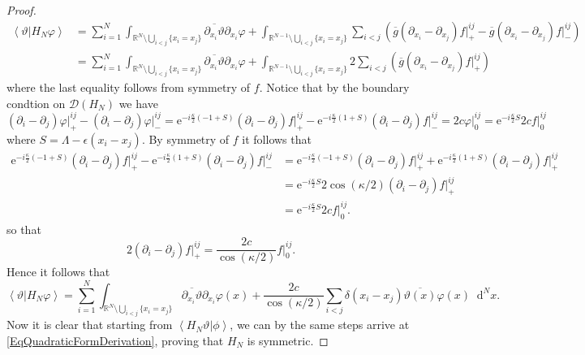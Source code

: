 \documentclass[a4paper,11pt]{article}
\newcommand{\euler}[1]{\text{e}^{#1}}
\renewcommand{\braket}[1]{\left\langle#1\right\rangle}
\newcommand*\diff{\mathop{}\!\mathrm{d}}
\newcommand{\R}{\mathbb{R}}
\numberwithin{equation}{section}
\begin{document}
\begin{proof}
		\begin{equation}
		\begin{aligned}
		\braket{\vartheta\vert H_N \varphi}&=\sum_{i=1}^{N}\int_{\R^N\setminus\bigcup_{i<j}\{x_i=x_j\}}\overline{\partial_{x_i}\vartheta}\partial_{x_i}\varphi+\int_{\R^{N-1}\setminus\bigcup_{i<j}\{x_i=x_j\}}\sum_{i< j}\left(\overline{g}(\partial_{x_i}-\partial_{x_j})f\vert^{ij}_+-\overline{g}(\partial_{x_i}-\partial_{x_j})f\vert^{ij}_-\right)\\
		&=\sum_{i=1}^{N}\int_{\R^N\setminus\bigcup_{i<j}\{x_i=x_j\}}\overline{\partial_{x_i}\vartheta}\partial_{x_i}\varphi+\int_{\R^{N-1}\setminus\bigcup_{i<j}\{x_i=x_j\}}2\sum_{i< j}\left(\overline{g}(\partial_{x_i}-\partial_{x_j})f\vert^{ij}_+\right)
		\end{aligned}
		\end{equation}
		where the last equality follows from symmetry of $ f $. Notice that by the boundary condtion on $ \mathcal{D}(H_N) $ we have \begin{equation}
		(\partial_i-\partial_j)\varphi\rvert^{ij}_+-(\partial_i-\partial_j)\varphi\rvert^{ij}_-=\euler{-i\frac{\kappa}{2}\left(-1+S\right)}(\partial_i-\partial_j)f\rvert^{ij}_+-\euler{-i\frac{\kappa}{2}\left(1+S\right)}(\partial_i-\partial_j)f\rvert^{ij}_-=2c \varphi\rvert^{ij}_0=\euler{-i\frac{\kappa}{2}S}2c f\rvert^{ij}_0
		\end{equation}
		where $ S=\Lambda-\epsilon(x_i-x_j) $. By symmetry of $ f $ it follows that \begin{equation}
		\begin{aligned}
		\euler{-i\frac{\kappa}{2}\left(-1+S\right)}(\partial_i-\partial_j)f\rvert^{ij}_+-\euler{-i\frac{\kappa}{2}\left(1+S\right)}(\partial_i-\partial_j)f\rvert^{ij}_-
		&=\euler{-i\frac{\kappa}{2}\left(-1+S\right)}(\partial_i-\partial_j)f\rvert^{ij}_++\euler{-i\frac{\kappa}{2}\left(1+S\right)}(\partial_i-\partial_j)f\rvert^{ij}_+\\
		&=\euler{-i\frac{\kappa}{2}S}2\cos(\kappa/2)(\partial_i-\partial_j)f\rvert^{ij}_+\\
		&=\euler{-i\frac{\kappa}{2}S}2c f\rvert^{ij}_0.
		\end{aligned}
		\end{equation}
		so that \begin{equation}
		2(\partial_i-\partial_j)f\rvert^{ij}_+=\frac{2c}{\cos(\kappa/2)}f\rvert^{ij}_0.
		\end{equation}
		Hence it follows that \begin{equation}\label{EqQuadraticFormDerivation}
		\braket{\vartheta\vert H_N \varphi}=\sum_{i=1}^{N}\int_{{\R^N\setminus\bigcup_{i<j}\{x_i=x_j\}}}\overline{\partial_{x_i}\vartheta} \partial_{x_i}\varphi(x)+\frac{2c}{\cos(\kappa/2)}\sum_{i<j} \delta(x_i-x_j)\overline{\vartheta(x)}\varphi(x)\diff^{N}x.
		\end{equation}
		Now it is clear that starting from $ \braket{H_N\vartheta\vert \phi} $, we can by the same steps arrive at \eqref{EqQuadraticFormDerivation}, proving that $ H_N $ is symmetric. 	
		\end{proof}
\end{document}
